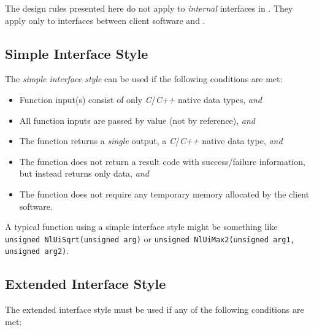 The design rules presented here do not apply to 
\emph{internal} interfaces in 
\emph{\productbasenameshort{}}\@.  They apply only to 
interfaces between client software and 
\emph{\productbasenameshort{}}.  


\subsection{Simple Interface Style}
\label{cldd0:sfcp0:sifs0}

The \emph{simple interface style} can be used if the 
following conditions are met: 

\begin{itemize}
\item Function input(s) consist of only \emph{C}/\emph{C++}
      native data types, \emph{and}
\item All function inputs are passed by value (not by
      reference), \emph{and}
\item The function returns a \emph{single} output, 
      a \emph{C}/\emph{C++}
      native data type, \emph{and}
\item The function does not return a result code with
      success/failure
      information, but instead returns only data, \emph{and}
\item The function does not require any temporary memory
      allocated by the client software.
\end{itemize}

A typical function using a simple interface style might be 
something like \texttt{unsigned NlUiSqrt(unsigned arg)} or 
\texttt{unsigned NlUiMax2(unsigned arg1, unsigned arg2)}.  


\subsection{Extended Interface Style}
\label{cldd0:sfcp0:sefs0}

The extended interface style must be used if any of the
following conditions are met:

